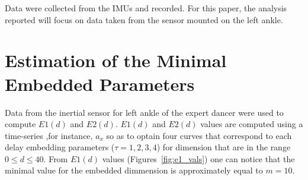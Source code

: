\documentclass{sigchi}
\begin{document}
Data were collected from the IMUs and recorded.  
For this paper, the analysis reported will focus on data taken from the sensor mounted on the left ankle. 






\section{Estimation of the Minimal Embedded Parameters}
Data from the inertial sensor for left ankle of the expert dancer were used to compute $E1(d)$ and $E2(d)$. 
$E1(d)$ and $E2(d)$ values are computed using a time-series ,for instance, $a_x$
so as to optain four curves that correspond to each delay embedding parameters ($\tau=1,2,3,4$)
for dimension that are in the range $0 \leq d \leq 40$.
From $E1(d)$ values (Figures~\ref{fig:e1_vals})
one can notice that the minimal value for the embedded dimmension is approximately
equal to $m=10$. 
  
  
\end{document}
